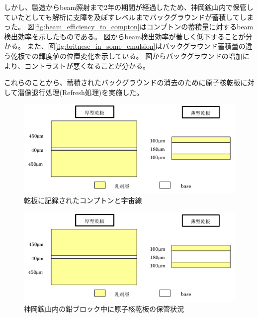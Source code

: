\documentclass[12pt,a4paper]{jarticle}
\begin{document}
\par
しかし、製造からbeam照射まで2年の期間が経過したため、神岡鉱山内で保管していたとしても解析に支障を及ぼすレベルまでバックグラウンドが蓄積してしまった。
図\ref{fig:beam_efficiency_to_compton}はコンプトンの蓄積量に対するbeam検出効率を示したものである。
図からbeam検出効率が著しく低下することが分かる。
また、図\ref{fig:britnese_in_some_emulsion}はバックグラウンド蓄積量の違う乾板での輝度値の位置変化を示している。
図からバックグラウンドの増加により、コントラストが悪くなることが分かる。
\par
これらのことから、蓄積されたバックグラウンドの消去のために原子核乾板に対して潜像退行処理(Refresh処理)を実施した。
\par
\begin{figure}[htbp]
    \begin{center}
     \includegraphics[width=140mm]{emulsionorder.png}
    \end{center}
    \caption{乾板に記録されたコンプトンと宇宙線\label{fig:compton_and_cosmicray_in_emulsion}}
\end{figure}
\begin{figure}[htbp]
    \begin{center}
     \includegraphics[width=140mm]{emulsionorder.png}
    \end{center}
    \caption{神岡鉱山内の鉛ブロック中に原子核乾板の保管状況\label{fig:emulsion_in_Kamioka}}
\end{figure}
\end{document}
